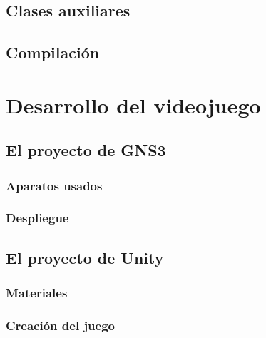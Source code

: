 \subsection{Clases auxiliares}\label{subsec:aux}

\subsection{Compilación}

\section{Desarrollo del videojuego}

\subsection{El proyecto de GNS3}

\subsubsection{Aparatos usados}

\subsubsection{Despliegue}

\subsection{El proyecto de Unity}

\subsubsection{Materiales}

\subsubsection{Creación del juego}
